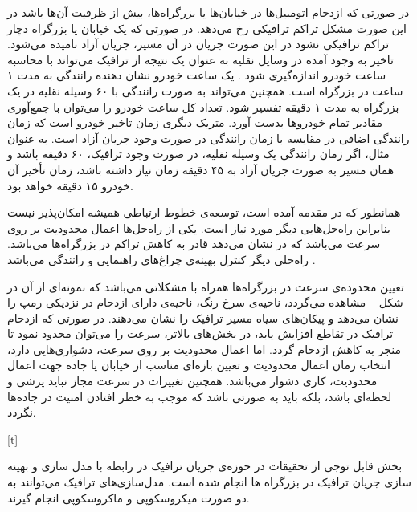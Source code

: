 

در صورتی که ازدحام اتومبیل‌ها در خیابان‌ها یا بزرگراه‌ها، بیش از ظرفیت آن‌ها باشد در این صورت مشکل تراکم ترافیکی رخ می‌دهد. در صورتی که یک خیابان یا بزرگراه دچار تراکم ترافیکی نشود در این صورت جریان در آن مسیر، جریان آزاد نامیده می‌شود.
تاخیر به وجود آمده در وسایل نقلیه به عنوان یک نتیجه از ترافیک می‌تواند با محاسبه ساعت خودرو اندازه‌گیری شود \cite{Jacob2006}. یک ساعت خودرو نشان دهنده رانندگی به مدت ۱ ساعت در بزرگراه است. همچنین می‌تواند به صورت رانندگی با ۶۰ وسیله نقلیه در یک بزرگراه به مدت ۱ دقیقه تفسیر شود. تعداد کل ساعت خودرو را می‌توان با جمع‌آوری مقادیر تمام خودرو‌ها بدست آورد. متریک دیگری زمان تاخیر خودرو است که زمان رانندگی اضافی در مقایسه با زمان رانندگی در صورت وجود جریان آزاد است. به عنوان مثال، اگر زمان رانندگی یک وسیله نقلیه، در صورت وجود ترافیک، ۶۰ دقیقه باشد و همان مسیر به صورت جریان آزاد به ۴۵ دقیقه زمان نیاز داشته باشد، زمان تأخیر آن خودرو ۱۵ دقیقه خواهد بود.

همانطور که در مقدمه آمده است، توسعه‌ی خطوط ارتباطی همیشه امکان‌پذیر نیست  بنابراین راه‌حل‌هایی دیگر مورد نیاز است. یکی از راه‌حل‌ها اعمال محدودیت بر روی سرعت می‌باشد که در \cite{Jacob2006} نشان می‌دهد قادر به کاهش تراکم در بزرگراه‌ها می‌باشد.
راه‌حلی دیگر کنترل بهینه‌ی چراغ‌های راهنمایی و رانندگی می‌باشد \cite{Wiering2000, Touhbi2017}.

تعیین محدوده‌ی سرعت در بزرگراه‌ها همراه با مشکلاتی می‌باشد که نمونه‌ای از آن در شکل ~ مشاهده می‌گردد، ناحیه‌ی سرخ رنگ، ناحیه‌ی دارای ازدحام در نزدیکی رمپ را نشان می‌دهد و پیکان‌های سیاه مسیر ترافیک را نشان می‌دهند. در صورتی که ازدحام ترافیک در تقاطع افزایش یابد، در بخش‌های بالاتر، سرعت را می‌توان محدود نمود تا منجر به کاهش ازدحام گردد.
اما اعمال محدودیت بر روی سرعت، دشواری‌هایی دارد، انتخاب زمان اعمال محدودیت و تعیین بازه‌ای مناسب از خیابان یا جاده جهت اعمال محدودیت، کاری دشوار می‌باشد. 
همچنین تغییرات در سرعت مجاز نباید پرشی و لحظه‌ای باشد، بلکه باید به صورتی باشد که موجب به خطر افتادن امنیت در جاده‌ها نگردد.

[t]


بخش قابل توجی از تحقیقات در حوزه‌ی جریان ترافیک در رابطه با مدل سازی و بهینه سازی جریان ترافیک در بزرگراه ها انجام شده است.
مدل‌سازی‌های ترافیک می‌توانند به دو صورت میکروسکوپی و ماکروسکوپی انجام گیرند.

